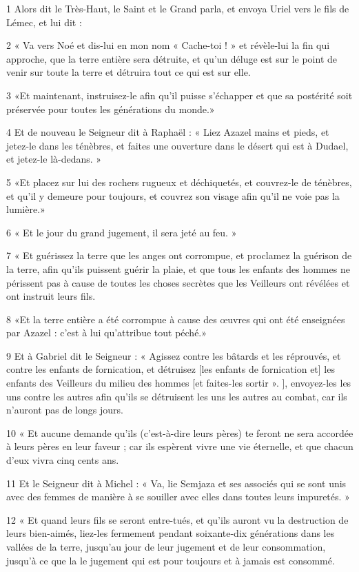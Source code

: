 \par 1 Alors dit le Très-Haut, le Saint et le Grand parla, et envoya Uriel vers le fils de Lémec, et lui dit :
\par 2 « Va vers Noé et dis-lui en mon nom « Cache-toi ! » et révèle-lui la fin qui approche, que la terre entière sera détruite, et qu'un déluge est sur le point de venir sur toute la terre et détruira tout ce qui est sur elle.
\par 3 «Et maintenant, instruisez-le afin qu'il puisse s'échapper et que sa postérité soit préservée pour toutes les générations du monde.»
\par 4 Et de nouveau le Seigneur dit à Raphaël : « Liez Azazel mains et pieds, et jetez-le dans les ténèbres, et faites une ouverture dans le désert qui est à Dudael, et jetez-le là-dedans. »
\par 5 «Et placez sur lui des rochers rugueux et déchiquetés, et couvrez-le de ténèbres, et qu'il y demeure pour toujours, et couvrez son visage afin qu'il ne voie pas la lumière.»
\par 6 « Et le jour du grand jugement, il sera jeté au feu. »
\par 7 « Et guérissez la terre que les anges ont corrompue, et proclamez la guérison de la terre, afin qu'ils puissent guérir la plaie, et que tous les enfants des hommes ne périssent pas à cause de toutes les choses secrètes que les Veilleurs ont révélées et ont instruit leurs fils.
\par 8 «Et la terre entière a été corrompue à cause des œuvres qui ont été enseignées par Azazel : c'est à lui qu'attribue tout péché.»
\par 9 Et à Gabriel dit le Seigneur : « Agissez contre les bâtards et les réprouvés, et contre les enfants de fornication, et détruisez [les enfants de fornication et] les enfants des Veilleurs du milieu des hommes [et faites-les sortir ». ], envoyez-les les uns contre les autres afin qu'ils se détruisent les uns les autres au combat, car ils n'auront pas de longs jours.
\par 10 « Et aucune demande qu'ils (c'est-à-dire leurs pères) te feront ne sera accordée à leurs pères en leur faveur ; car ils espèrent vivre une vie éternelle, et que chacun d’eux vivra cinq cents ans.
\par 11 Et le Seigneur dit à Michel : « Va, lie Semjaza et ses associés qui se sont unis avec des femmes de manière à se souiller avec elles dans toutes leurs impuretés. »
\par 12 « Et quand leurs fils se seront entre-tués, et qu'ils auront vu la destruction de leurs bien-aimés, liez-les fermement pendant soixante-dix générations dans les vallées de la terre, jusqu'au jour de leur jugement et de leur consommation, jusqu'à ce que la le jugement qui est pour toujours et à jamais est consommé.
